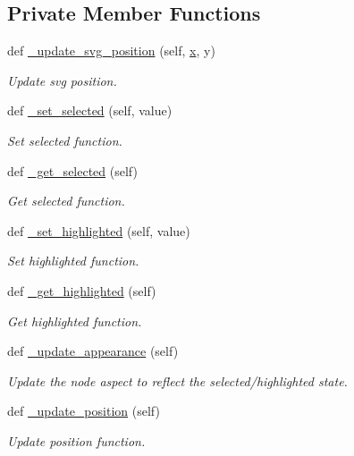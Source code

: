 \subsection*{Private Member Functions}
\begin{DoxyCompactItemize}
\item 
def \hyperlink{classvisualizer_1_1core_1_1Node_a8ff483c6fb127e0fabe4c1175a955bb8}{\+\_\+update\+\_\+svg\+\_\+position} (self, \hyperlink{lte__link__budget__x2__handover__measures_8m_a9336ebf25087d91c818ee6e9ec29f8c1}{x}, y)
\begin{DoxyCompactList}\small\item\em Update svg position. \end{DoxyCompactList}\item 
def \hyperlink{classvisualizer_1_1core_1_1Node_a3ceba64906269d901c47af74a60f06a0}{\+\_\+set\+\_\+selected} (self, value)
\begin{DoxyCompactList}\small\item\em Set selected function. \end{DoxyCompactList}\item 
def \hyperlink{classvisualizer_1_1core_1_1Node_aa122aa19624f41bde75b477e019c7fdb}{\+\_\+get\+\_\+selected} (self)
\begin{DoxyCompactList}\small\item\em Get selected function. \end{DoxyCompactList}\item 
def \hyperlink{classvisualizer_1_1core_1_1Node_ae5beb3fb1baf0a82aac7d97095be2e03}{\+\_\+set\+\_\+highlighted} (self, value)
\begin{DoxyCompactList}\small\item\em Set highlighted function. \end{DoxyCompactList}\item 
def \hyperlink{classvisualizer_1_1core_1_1Node_aacbcdfc12f4b0d7dc0b70034de8216d5}{\+\_\+get\+\_\+highlighted} (self)
\begin{DoxyCompactList}\small\item\em Get highlighted function. \end{DoxyCompactList}\item 
def \hyperlink{classvisualizer_1_1core_1_1Node_ae5b37840dd64cdf83640f3e4e0ac7f09}{\+\_\+update\+\_\+appearance} (self)
\begin{DoxyCompactList}\small\item\em Update the node aspect to reflect the selected/highlighted state. \end{DoxyCompactList}\item 
def \hyperlink{classvisualizer_1_1core_1_1Node_ac783a9a6e8c4799d2b38cf5cc5ce71f3}{\+\_\+update\+\_\+position} (self)
\begin{DoxyCompactList}\small\item\em Update position function. \end{DoxyCompactList}\end{DoxyCompactItemize}
